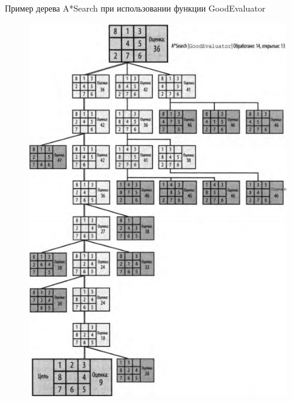 \documentclass{beamer}
\begin{document}
\begin{frame}
Пример дерева A*Search при использовании функции GoodEvaluator
\begin{figure}[h]
\centering
\includegraphics[scale=0.4]{images/lec06-pic11.png}
\end{figure}
\end{frame}
\end{document}
